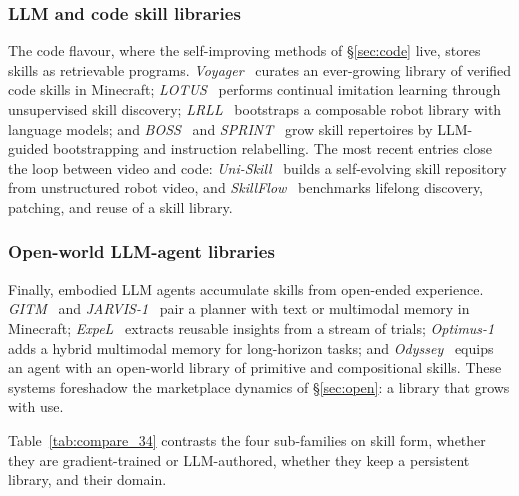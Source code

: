 \subsubsection{LLM and code skill libraries}
The code flavour, where the self-improving methods of \S\ref{sec:code} live, stores skills as
retrievable programs. \emph{Voyager}~\citep{voyager} curates an ever-growing library of
verified code skills in Minecraft; \emph{LOTUS}~\citep{lotus} performs continual imitation
learning through unsupervised skill discovery; \emph{LRLL}~\citep{lrll} bootstraps a composable
robot library with language models; and \emph{BOSS}~\citep{boss} and \emph{SPRINT}~\citep{sprint}
grow skill repertoires by LLM-guided bootstrapping and instruction relabelling. The most recent
entries close the loop between video and code: \emph{Uni-Skill}~\citep{uniskill} builds a
self-evolving skill repository from unstructured robot video, and \emph{SkillFlow}~\citep{skillflow}
benchmarks lifelong discovery, patching, and reuse of a skill library.

\subsubsection{Open-world LLM-agent libraries}
Finally, embodied LLM agents accumulate skills from open-ended experience.
\emph{GITM}~\citep{gitm} and \emph{JARVIS-1}~\citep{jarvis1} pair a planner with text or
multimodal memory in Minecraft; \emph{ExpeL}~\citep{expel} extracts reusable insights from a
stream of trials; \emph{Optimus-1}~\citep{optimus1} adds a hybrid multimodal memory for
long-horizon tasks; and \emph{Odyssey}~\citep{odyssey} equips an agent with an open-world
library of primitive and compositional skills. These systems foreshadow the marketplace
dynamics of \S\ref{sec:open}: a library that grows with use.

Table~\ref{tab:compare_34} contrasts the four sub-families on skill form, whether they are
gradient-trained or LLM-authored, whether they keep a persistent library, and their domain.

